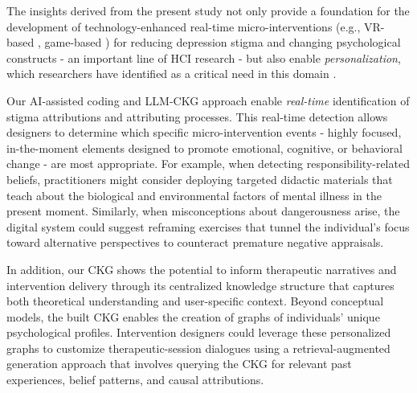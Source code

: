
The insights derived from the present study not only provide a foundation for the development of technology-enhanced real-time micro-interventions (e.g., VR-based \cite{realtime_martinez_2024}, game-based \cite{personalized_anvari_2024}) for reducing depression stigma and changing psychological constructs - an important line of HCI research - but also enable \textit{personalization}, which researchers have identified as a critical need in this domain \cite{personalized_anvari_2024}.


Our AI-assisted coding and LLM-CKG approach enable \textit{real-time} identification of stigma attributions and attributing processes. 
This real-time detection allows designers to determine which specific micro-intervention events - highly focused, in-the-moment elements designed to promote emotional, cognitive, or behavioral change \cite{micro_intervention_baumel_2020, micro_intervention_howe_2022} - are most appropriate. 
For example, when detecting responsibility-related beliefs, practitioners might consider deploying targeted didactic materials that teach about the biological and environmental factors \cite{belief_reviewer_peter_2021} of mental illness in the present moment. 
Similarly, when misconceptions about dangerousness arise, the digital system could suggest reframing exercises that tunnel the individual's focus toward alternative perspectives \cite{micro_intervention_howe_2022} to counteract premature negative appraisals.

In addition, our CKG shows the potential to inform therapeutic narratives and intervention delivery \cite{micro_intervention_baumel_2020} through its centralized knowledge structure that captures both theoretical understanding and user-specific context. 
Beyond conceptual models, the built CKG enables the creation of graphs of individuals' unique psychological profiles. 
Intervention designers could leverage these personalized graphs to customize therapeutic-session dialogues using a retrieval-augmented generation approach \cite{rag_chen_2024} that involves querying the CKG for relevant past experiences, belief patterns, and causal attributions.


